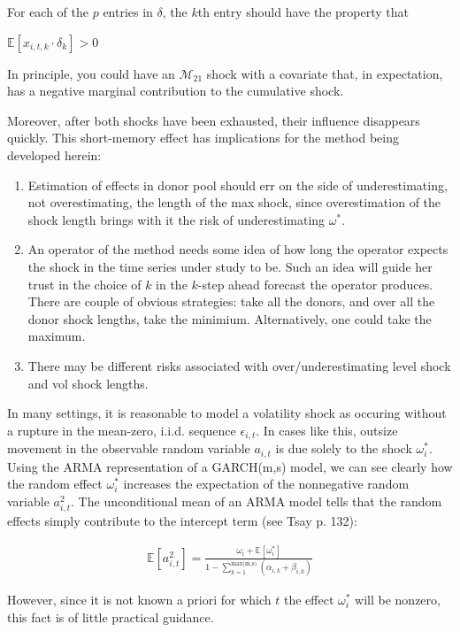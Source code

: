 \documentclass[11pt]{article}
\def\mc#1{\mathcal{#1}} %
\def\mc#1{\mathcal{#1}}
\theoremstyle{definition}
\begin{document}
 For each of the $p$ entries in $\delta$, the $k$th entry should have the property that
 
 $\mathbb{E}[ x_{i,t,k} \cdot \delta_{k} ] > 0$
 
 In principle, you could have an $\mc{M}_{21}$ shock with a covariate that, in expectation, has a negative marginal contribution to the cumulative shock.

Moreover, after both shocks have been exhausted, their influence disappears quickly.  This short-memory effect has implications for the method being developed herein:

\begin{enumerate}
\item Estimation of effects in donor pool should err on the side of underestimating, not overestimating, the length of the max shock, since overestimation of the shock length brings with it the risk of underestimating $\omega^{*}$.
\item An operator of the method needs some idea of how long the operator expects the shock in the time series under study to be.  Such an idea will guide her trust in the choice of $k$ in the $k$-step ahead forecast the operator produces.  There are couple of obvious strategies: take all the donors, and over all the donor shock lengths, take the minimium.  Alternatively, one could take the maximum.
\item There may be different risks associated with over/underestimating level shock and vol shock lengths.
\end{enumerate}

In many settings, it is reasonable to model a volatility shock as occuring without a rupture in the mean-zero, i.i.d. sequence $\epsilon_{i,t}$.  In cases like this, outsize movement in the observable random variable $a_{i,t}$ is due solely to the shock $\omega_{i}^{*}$.  Using the ARMA representation of a GARCH(m,s) model, we can see clearly how the random effect $\omega_{i}^{*}$ increases the expectation of the nonnegative random variable $a_{i,t}^{2}$.  The unconditional mean of an ARMA model tells that the random effects simply contribute to the intercept term (see Tsay p. 132):

\begin{align*} 
\mathbb{E}[a^{2}_{i,t}] = \frac{\omega_{i} + \mathbb{E}[\omega_{i}^{*}] }{1 - \sum^{\text{max(m,s)}}_{k=1}(\alpha_{i,k}+\beta_{i,k})}
\end{align*} 

However, since it is not known a priori for which $t$ the effect $\omega_{i}^{*}$ will be nonzero, this fact is of little practical guidance.
\end{document}
